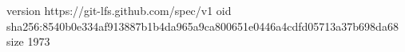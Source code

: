 version https://git-lfs.github.com/spec/v1
oid sha256:8540b0e334af913887b1b4da965a9ca800651e0446a4cdfd05713a37b698da68
size 1973
